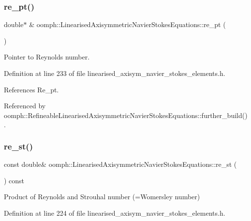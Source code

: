 \subsubsection{\texorpdfstring{re\+\_\+pt()}{re\_pt()}}
{\footnotesize\ttfamily double$\ast$ \& oomph\+::\+Linearised\+Axisymmetric\+Navier\+Stokes\+Equations\+::re\+\_\+pt (\begin{DoxyParamCaption}{ }\end{DoxyParamCaption})\hspace{0.3cm}{\ttfamily [inline]}}



Pointer to Reynolds number. 



Definition at line 233 of file linearised\+\_\+axisym\+\_\+navier\+\_\+stokes\+\_\+elements.\+h.



References Re\+\_\+pt.



Referenced by oomph\+::\+Refineable\+Linearised\+Axisymmetric\+Navier\+Stokes\+Equations\+::further\+\_\+build().

\mbox{\label{classoomph_1_1LinearisedAxisymmetricNavierStokesEquations_a57172dbe008a3b6889397c64fa9e5172}} 
\subsubsection{\texorpdfstring{re\+\_\+st()}{re\_st()}}
{\footnotesize\ttfamily const double\& oomph\+::\+Linearised\+Axisymmetric\+Navier\+Stokes\+Equations\+::re\+\_\+st (\begin{DoxyParamCaption}{ }\end{DoxyParamCaption}) const\hspace{0.3cm}{\ttfamily [inline]}}



Product of Reynolds and Strouhal number (=Womersley number) 



Definition at line 224 of file linearised\+\_\+axisym\+\_\+navier\+\_\+stokes\+\_\+elements.\+h.



